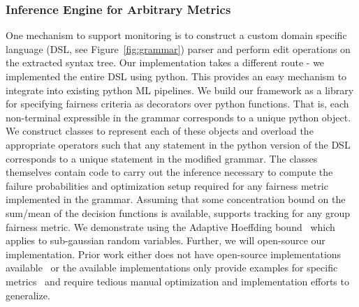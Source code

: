 \subsubsection{Inference Engine for Arbitrary Metrics}
One mechanism to support monitoring is to construct a custom domain specific language (DSL, see Figure~\ref{fig:grammar}) parser and perform edit operations on the extracted syntax tree.
Our implementation takes a different route - we implemented the entire DSL using python. 
This provides an easy mechanism to integrate \AVOIRmethodname{} into existing python ML pipelines.
We build our framework as a library for specifying fairness criteria as decorators over python functions. 
That is, each non-terminal expressible in the grammar corresponds to a unique python object. 
We construct classes to represent each of these objects and overload the appropriate operators such that any statement in the python version of the DSL corresponds to a unique statement in the modified grammar. 
The classes themselves contain code to carry out the inference necessary to compute the failure probabilities and optimization setup required for any fairness metric implemented in the grammar.
Assuming that some concentration bound on the sum/mean of the decision functions is available, \AVOIRmethodname{} supports tracking for any group fairness metric. 
We demonstrate \AVOIRmethodname{} using the Adaptive Hoeffding bound~\citep{zhao2016adaptive} which applies to sub-gaussian random variables.
Further, we will open-source our implementation.
Prior work either does not have open-source implementations available~\citep{albarghouthi2019fairness} or the available implementations only provide examples for specific metrics~\citep{bastani2019probabilistic} and require tedious manual optimization and implementation efforts to generalize. %
    
